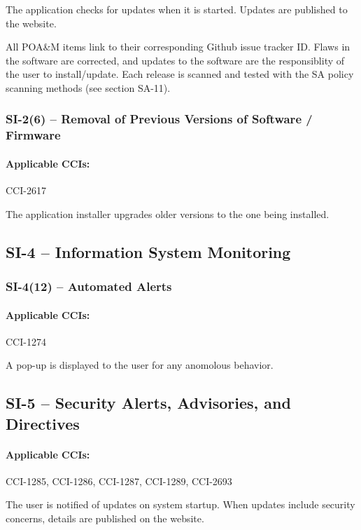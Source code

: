 \documentclass[letterpaper, 10pt, twoside]{article}
\begin{document}
The application checks for updates when it is started. Updates are published to the website.

All POA\&M items link to their corresponding Github issue tracker ID. Flaws in the software are corrected, and updates to the software are the responsiblity of the user to install/update. Each release is scanned and tested with the SA policy scanning methods (see section SA-11).

\subsubsection{SI-2(6) -- Removal of Previous Versions of Software / Firmware}

\paragraph{Applicable CCIs:} CCI-2617

The application installer upgrades older versions to the one being installed.

\subsection{SI-4 -- Information System Monitoring}

\subsubsection{SI-4(12) -- Automated Alerts}

\paragraph{Applicable CCIs:} CCI-1274

A pop-up is displayed to the user for any anomolous behavior.

\subsection{SI-5 -- Security Alerts, Advisories, and Directives}

\paragraph{Applicable CCIs:} CCI-1285, CCI-1286, CCI-1287, CCI-1289, CCI-2693

The user is notified of updates on system startup. When updates include security concerns, details are published on the website.
\end{document}

